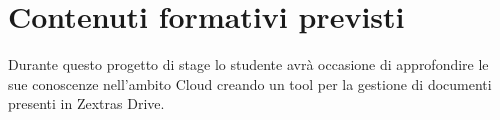 \section*{Contenuti formativi previsti}
Durante questo progetto di stage lo studente avrà occasione di approfondire le sue conoscenze nell'ambito
Cloud creando un tool per la gestione di documenti presenti in Zextras Drive. 
\newpage